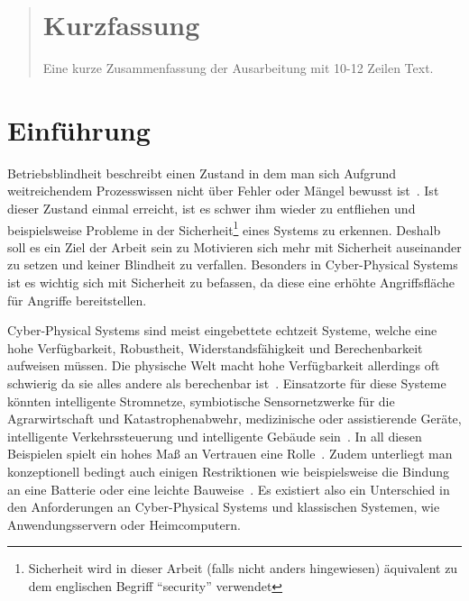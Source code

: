 \documentclass[final,bibliography=totocnumbered]{include/sikseminar}
\begin{document}
\makeTitle

\makeAuthor

\date{Datum des Vortrags \todo}

\subject{Seminar Cyber-Physical Systems}

\maketitle

\begin{abstract}
\section*{Kurzfassung}
Eine kurze Zusammenfassung der Ausarbeitung mit 10-12 Zeilen Text.
\end{abstract}
\thispagestyle{empty}
\newpage
\tableofcontents
\newpage

\section{Einführung}\label{sec:intro}
Betriebsblindheit beschreibt einen Zustand in dem man sich Aufgrund weitreichendem Prozesswissen nicht über Fehler oder Mängel bewusst ist~\cite[S.~202]{GK16}.
Ist dieser Zustand einmal erreicht, ist es schwer ihm wieder zu entfliehen und beispielsweise Probleme in der Sicherheit\footnote{Sicherheit wird in dieser Arbeit (falls nicht anders hingewiesen) äquivalent zu dem englischen Begriff \enquote{security} verwendet} eines Systems zu erkennen.
Deshalb soll es ein Ziel der Arbeit sein zu Motivieren sich mehr mit Sicherheit auseinander zu setzen und keiner Blindheit zu verfallen.
Besonders in Cyber-Physical Systems ist es wichtig sich mit Sicherheit zu befassen, da diese eine erhöhte Angriffsfläche für Angriffe bereitstellen.

Cyber-Physical Systems sind meist eingebettete echtzeit Systeme, welche eine hohe Verfügbarkeit, Robustheit, Widerstandsfähigkeit und Berechenbarkeit aufweisen müssen.
Die physische Welt macht hohe Verfügbarkeit allerdings oft schwierig da sie alles andere als berechenbar ist~\cite{Lee08,SGL+08}.
Einsatzorte für diese Systeme könnten intelligente Stromnetze, symbiotische Sensornetzwerke für die Agrarwirtschaft und Katastrophenabwehr, medizinische oder assistierende Geräte, intelligente Verkehrssteuerung und intelligente Gebäude sein~\cite{RLS+10}.
In all diesen Beispielen spielt ein hohes Maß an Vertrauen eine Rolle~\cite{SGL+08}.
Zudem unterliegt man konzeptionell bedingt auch einigen Restriktionen wie beispielsweise die Bindung an eine Batterie oder eine leichte Bauweise~\cite{YWY+17}.
Es existiert also ein Unterschied in den Anforderungen an Cyber-Physical Systems und klassischen Systemen, wie Anwendungsservern oder Heimcomputern.
\end{document}
